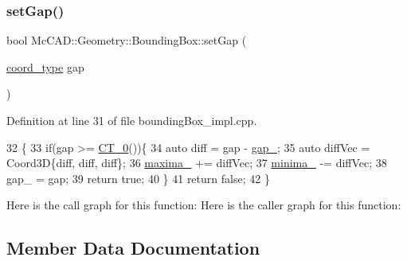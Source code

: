\mbox{\label{classMcCAD_1_1Geometry_1_1BoundingBox_a78c149a7c7e7d6074a2b726a63c3c400}} 
\subsubsection{\texorpdfstring{set\+Gap()}{setGap()}\hspace{0.1cm}{\footnotesize\ttfamily [2/2]}}
{\footnotesize\ttfamily bool Mc\+C\+A\+D\+::\+Geometry\+::\+Bounding\+Box\+::set\+Gap (\begin{DoxyParamCaption}\item[{\hyperlink{namespaceMcCAD_1_1Geometry_ac043b37a4a7e849fca22869e1982d2f8}{coord\+\_\+type}}]{gap }\end{DoxyParamCaption})}



Definition at line 31 of file bounding\+Box\+\_\+impl.\+cpp.


\begin{DoxyCode}
32                        \{
33     \textcolor{keywordflow}{if}(gap >= \hyperlink{namespaceMcCAD_1_1Geometry_ac29462a1071e96a3eb0bce1b4097af64}{CT\_0}())\{
34         \textcolor{keyword}{auto} diff = gap - \hyperlink{classMcCAD_1_1Geometry_1_1BoundingBox_a1da14473a49c952f47135446c3c90ae9}{gap\_};
35         \textcolor{keyword}{auto} diffVec = Coord3D\{diff, diff, diff\};
36         \hyperlink{classMcCAD_1_1Geometry_1_1BoundingBox_aa69d74a92caca3795ecd4089c3f71a87}{maxima\_} += diffVec;
37         \hyperlink{classMcCAD_1_1Geometry_1_1BoundingBox_a2fbfb7dc1c01528377da86ff313fc6e6}{minima\_} -= diffVec;
38         gap\_ = gap;
39         \textcolor{keywordflow}{return} \textcolor{keyword}{true};
40     \}
41     \textcolor{keywordflow}{return} \textcolor{keyword}{false};
42 \}
\end{DoxyCode}
Here is the call graph for this function\+:
Here is the caller graph for this function\+:


\subsection{Member Data Documentation}
\mbox{\label{classMcCAD_1_1Geometry_1_1BoundingBox_a1da14473a49c952f47135446c3c90ae9}} 
